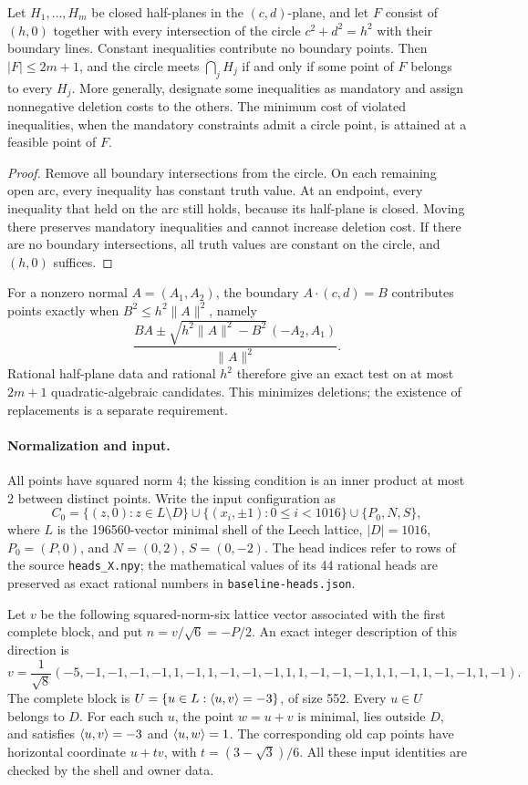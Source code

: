 \begin{proposition}\label{prop:chord-finite}
Let $H_1,\ldots,H_m$ be closed half-planes in the $(c,d)$-plane,
and let $F$ consist of $(h,0)$ together with every intersection of
the circle $c^2+d^2=h^2$ with their boundary lines. Constant
inequalities contribute no boundary points. Then $|F|\le2m+1$, and
the circle meets $\bigcap_jH_j$ if and only if some point of $F$
belongs to every $H_j$.
More generally, designate some inequalities as mandatory and assign
nonnegative deletion costs to the others. The minimum cost of violated
inequalities, when the mandatory constraints admit a circle point,
is attained at a feasible point of $F$.
\end{proposition}
\begin{proof}
Remove all boundary intersections from the circle. On each remaining
open arc, every inequality has constant truth value. At an endpoint,
every inequality that held on the arc still holds, because its half-plane
is closed. Moving there preserves mandatory inequalities and cannot
increase deletion cost. If there are no boundary intersections, all truth
values are constant on the circle, and $(h,0)$ suffices.
\end{proof}

For a nonzero normal $A=(A_1,A_2)$, the boundary $A\cdot(c,d)=B$
contributes points exactly when $B^2\le h^2\|A\|^2$, namely
\[
 \frac{BA\pm\sqrt{h^2\|A\|^2-B^2}\,(-A_2,A_1)}{\|A\|^2}.
\]
Rational half-plane data and rational $h^2$ therefore give an exact
test on at most $2m+1$ quadratic-algebraic candidates. This minimizes
deletions; the existence of replacements is a separate requirement.

\paragraph{Normalization and input.}
All points have squared norm 4; the kissing condition is an inner product
at most 2 between distinct points. Write the input configuration as
\[
 C_0=\{(z,0):z\in L\setminus D\}
 \cup\{(x_i,\pm1):0\le i<1016\}
 \cup\{P_0,N,S\},
\]
where $L$ is the 196560-vector minimal shell of the Leech lattice,
$|D|=1016$, $P_0=(P,0)$, and $N=(0,2)$, $S=(0,-2)$.
The head indices refer to rows of the source \texttt{heads\_X.npy}; the
mathematical values of its 44 rational heads are preserved as exact
rational numbers in \texttt{baseline-heads.json}.

Let $v$ be the following squared-norm-six lattice vector associated
with the first complete block, and put $n=v/\sqrt6=-P/2$.
An exact integer description of this direction is
\[
v=\frac{1}{\sqrt8}(-5,-1,-1,-1,-1,1,-1,1,-1,-1,-1,1,
1,-1,-1,-1,1,1,-1,1,-1,-1,1,-1).
\]
The complete block is $U=\{u\in L:\langle u,v\rangle=-3\}$, of size 552.
Every $u\in U$ belongs to $D$. For each such $u$, the point $w=u+v$ is
minimal, lies outside $D$, and satisfies $\langle u,v\rangle=-3$ and $\langle u,w\rangle=1$.
The corresponding old cap points have horizontal coordinate
$u+t v$, with $t=(3-\sqrt3)/6$.
All these input identities are checked by the shell and owner data.

